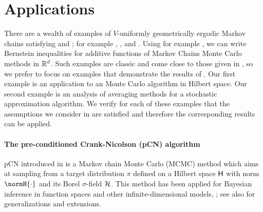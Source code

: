 \section{Applications}
\label{sec:applications}

There are a wealth of examples of $V$-uniformly geometrically ergodic Markov chains satisfying  and ;  for example \citep[Chapter~15]{meyn:tweedie}, \citep{roberts:rosenthal:2004}, and \citep[Chapters~2,15]{douc:moulines:priouret:soulier:2018}. Using for example \citep{roberts:rosenthal:2004}, we can write Bernstein inequalities for additive functions of Markov Chains Monte Carlo methods in $\mathbb{R}^d$. Such examples are classic and come close to those given in \cite{adamczak2015exponential}, so we prefer to focus on examples that demonstrate the results of . Our first example is an application to an Monte Carlo algorithm in Hilbert space. Our second example is an analysis of averaging methods for a stochastic approximation algorithm. We verify for each of these examples that the assumptions we consider in  are satisfied and therefore the corresponding results can be applied.

\paragraph{The pre-conditioned Crank-Nicolson (pCN) algorithm}
pCN introduced in \cite{beskos:roberts:stuart:voss:2008,cotter:roberts:stuart:white:2013} is a Markov chain Monte Carlo (MCMC) method which aims at sampling
from a target distribution $\pi$ defined on a Hilbert space $\mathsf{H}$ with norm $\normH{\cdot}$ and
its Borel $\sigma$-field $\mathcal{H}$. This method has been applied for Bayesian inference in function
spaces and other infinite-dimensional models,
\cite{stuart:2010,cotter:roberts:stuart:white:2013,buitanh:ghattas:2014,eberle:2014,agapiou:roberts:vollmer:2018};
see also \cite{beskos:pinski:sanzserna:stuart:2011,ottobre:et:al:2016,rudolf:sprungk:2018,hosseini2018spectral} for generalizations and extensions.


